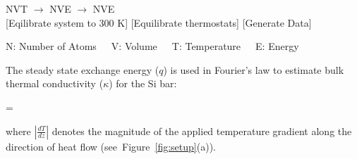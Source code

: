 \begin{center}

NVT \hspace{5mm} $\rightarrow$ \hspace{5mm} NVE \hspace{5mm}
$\rightarrow$ \hspace{5mm} NVE
\\ \vspace{1mm}
\tiny \hspace{-5mm}[Eqilibrate system to 300 K] \hspace{1mm} [Equilibrate thermostats] \hspace{4mm}
 [Generate Data]
\\ \vspace{1mm}

\tiny{N: Number of Atoms~~~V: Volume~~~T: Temperature~~~E: Energy}
\end{center}

The steady state exchange energy ($q$) is used in Fourier's law to estimate bulk thermal conductivity ($\kappa$)
for the Si  bar:

\be
 \kappa =  
\ee

\noindent where $\left|\frac{dT}{dz}\right|$ denotes the magnitude of the applied temperature gradient along the 
direction of heat flow (see~Figure~\ref{fig:setup}(a)).






























